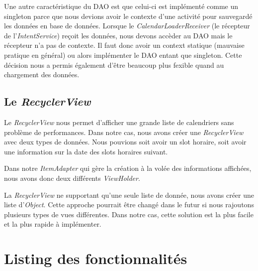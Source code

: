 \documentclass{article}
\begin{document}
            Une autre caractéristique du DAO est que celui-ci est implémenté comme un singleton
            parce que nous devions avoir le contexte d'une activité pour sauvegardé les données en
            base de données. Lorsque le \textit{CalendarLoaderReceiver} (le récepteur de
            l'\textit{IntentService}) reçoit les données, nous devons accèder au DAO mais le
            récepteur n'a pas de contexte. Il faut donc avoir un context statique (mauvaise pratique
            en général) ou alors implémenter le DAO entant que singleton. Cette décision nous a
            permis également d'être beaucoup plus fexible quand au chargement des données.

        \subsection{Le \textit{RecyclerView}}
            Le \textit{RecyclerView} nous permet d'afficher une grande liste de calendriers sans
            problème de performances. Dans notre cas, nous avons créer une \textit{RecyclerView}
            avec deux types de données. Nous pouvions soit avoir un slot horaire, soit avoir une
            information sur la date des slots horaires suivant.

            Dans notre \textit{ItemAdapter} qui gère la création à la volée des informations
            affichées, nous avons donc deux différents \textit{ViewHolder}.

            La \textit{RecyclerView} ne supportant qu'une seule liste de donnée, nous avons créer
            une liste d'\textit{Object}. Cette approche pourrait être changé dans le futur si nous
            rajoutons plusieurs types de vues différentes. Dans notre cas, cette solution est la
            plus facile et la plus rapide à implémenter.

	\section{Listing des fonctionnalités}
\end{document}
